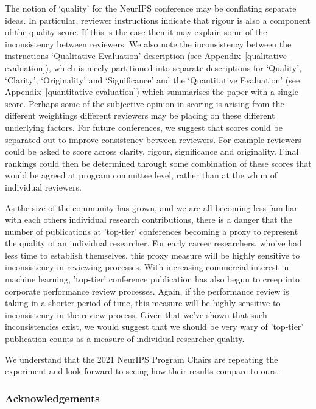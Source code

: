 \documentclass[twoside]{article}
\begin{document}
The notion of `quality' for the NeurIPS conference may be conflating
separate ideas. In particular, reviewer instructions indicate that
rigour is also a component of the quality score. If this is the case
then it may explain some of the inconsistency between
reviewers. We also note the inconsistency between the instructions `Qualitative Evaluation' description (see Appendix~\ref{qualitative-evaluation}), which is nicely partitioned into separate descriptions for `Quality', `Clarity', `Originality' and `Significance' and the `Quantitative Evaluation' (see Appendix~\ref{quantitative-evaluation}) which summarises the paper with a single score. Perhaps some of the subjective opinion in scoring is arising
from the different weightings different reviewers may be placing on
these different underlying factors. For future conferences, we suggest that scores
could be separated out to improve consistency between reviewers. For
example reviewers could be asked to score across clarity, rigour,
significance and originality. Final rankings could then be determined
through some combination of these scores that would be agreed at
program committee level, rather than at the whim of individual
reviewers.

As the size of the community has grown, and we are all becoming less familiar with each others individual research contributions, there is a danger that the number of publications at 'top-tier' conferences becoming a proxy to represent the quality of an individual researcher. For early career researchers, who've had less time to establish themselves, this proxy measure will be highly sensitive to inconsistency in reviewing processes. With increasing commercial interest in machine learning, 'top-tier' conference publication has also begun to creep into corporate performance review processes. Again, if the performance review is taking in a shorter period of time, this measure will be highly sensitive to inconsistency in the review process. Given that we've shown that such inconsistencies exist, we would suggest that we should be very wary of 'top-tier' publication counts as a measure of individual researcher quality.

We understand that the 2021 NeurIPS Program Chairs are repeating the experiment and look forward to seeing how their results compare to ours.

\subsubsection*{Acknowledgements}
\end{document}
